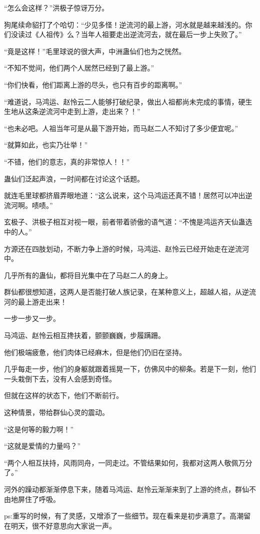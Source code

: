 \begin{this_body}
“怎么会这样？”洪极子惊讶万分。

狗尾续命貂打了个哈切：“少见多怪！逆流河的最上游，河水就是越来越浅的。你们没读过《人祖传》么？当年人祖要走出逆流河去，就在最后一步上失败了。”

“竟是这样！”毛里球说的很大声，中洲蛊仙们也为之恍然。

“不知不觉间，他们两个人居然已经到了最上游。”

“你们快看，他们距离上游的尽头，也只有百步的距离啊。”

“难道说，马鸿运、赵怜云二人能够打破纪录，做出人祖都尚未完成的事情，硬生生地从这条逆流河中走到上游，走出来？！”

“也未必吧。人祖当年可是从最下游开始，而马赵二人不知讨了多少便宜呢。”

“就算如此，也实乃壮举！”

“不错，他们的意志，真的非常惊人！！”

蛊仙们泛起声浪，一时间都在讨论这个话题。

就连毛里球都挤眉弄眼地道：“这么说来，这个马鸿运还真不错！居然可以冲出逆流河啊。啧啧。”

玄极子、洪极子相互对视一眼，前者带着骄傲的语气道：“不愧是鸿运齐天仙蛊选中的人。”

方源还在四肢划动，不断力争上游的时候，马鸿运、赵怜云已经开始走在逆流河中。

几乎所有的蛊仙，都将目光集中在了马赵二人的身上。

群仙都很想知道，这两人是否能打破人族记录，在某种意义上，超越人祖，从逆流河的最上游走出来！

一步一步又一步。

马鸿运、赵怜云相互搀扶着，颤颤巍巍，步履蹒跚。

他们极端疲惫，他们肉体已经麻木，但是他们仍旧在坚持。

几乎每走一步，他们的身躯就跟着摇晃一下，仿佛风中的柳条。若是下一刻，他们一头栽倒下去，没有人会感到奇怪。

但就在这样的状态下，他们不断前行。

这种情景，带给群仙心灵的震动。

“这是何等的毅力啊！”

“这就是爱情的力量吗？”

“两个人相互扶持，风雨同舟，一同走过。不管结果如何，我都对这两人敬佩万分了。”

河外的躁动都渐渐停息下来，随着马鸿运、赵怜云渐渐来到了上游的终点，群仙不由地屏住了呼吸。

ps:重写的时候，有了灵感，又增添了一些细节。现在看来是初步满意了。高潮留在明天，很不好意思向大家说一声。

\end{this_body}

